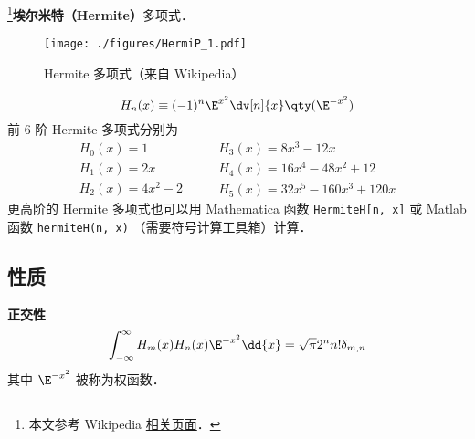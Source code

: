 
\begin{issues}
\issueDraft
\end{issues}

\footnote{本文参考 Wikipedia \href{https://en.wikipedia.org/wiki/Hermite_polynomials}{相关页面}．}\textbf{埃尔米特（Hermite）}多项式．

\begin{figure}[ht]
\centering
\texttt{[image: ./figures/HermiP\_1.pdf]}
\caption{Hermite 多项式（来自 Wikipedia）} \label{HermiP_fig1}
\end{figure}

\begin{equation}
H_n(x) \equiv (- 1)^n \E^{x^2} \dv[n]{x} \qty(\E^{-x^2})
\end{equation}
前 6 阶 Hermite 多项式分别为
\begin{equation}
\begin{array}{l}
H_0(x) = 1\\
H_1(x) = 2x\\
H_2(x) = 4x^2 - 2
\end{array}
\qquad
\begin{array}{l}
H_3(x) = 8x^3 - 12x\\
H_4(x) = 16x^4 - 48x^2 + 12\\
H_5(x) = 32x^5 - 160x^3 + 120x
\end{array}
\end{equation}
更高阶的 Hermite 多项式也可以用 Mathematica 函数 \verb|HermiteH[n, x]| 或 Matlab 函数 \verb|hermiteH(n, x)| （需要符号计算工具箱）计算．

\subsection{性质}
\textbf{正交性}
\begin{equation}%
\int_{-\infty}^\infty H_m(x) H_n(x) \E^{-x^2} \dd{x} = \sqrt{\pi}2^n n! \delta_{m,n}
\end{equation}
其中 $\E^{-x^2}$ 被称为权函数．
